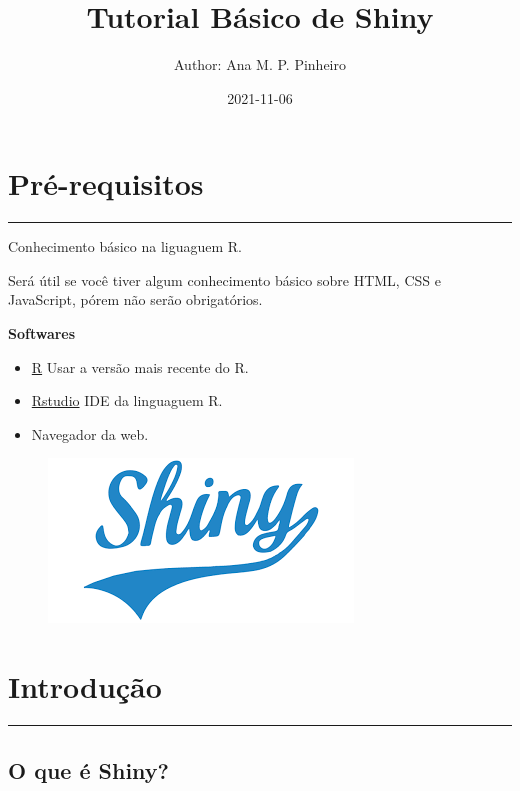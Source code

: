 \documentclass[
]{book}
\title{Tutorial Básico de Shiny}
\author{Author: Ana M. P. Pinheiro}
\date{2021-11-06}
\providecommand{\tightlist}{%
  \setlength{\itemsep}{0pt}\setlength{\parskip}{0pt}}
\begin{document}
\maketitle

{
\setcounter{tocdepth}{1}
\tableofcontents
}
\hypertarget{pruxe9-requisitos}{%
\chapter*{Pré-requisitos}\label{pruxe9-requisitos}}

\begin{center}\rule{0.5\linewidth}{0.5pt}\end{center}

Conhecimento básico na liguaguem R.

Será útil se você tiver algum conhecimento básico sobre HTML, CSS e JavaScript, pórem não serão obrigatórios.

\textbf{Softwares}

\begin{itemize}
\tightlist
\item
  \href{https://www.r-project.org/}{R} Usar a versão mais recente do R.
\item
  \href{https://www.rstudio.com/}{Rstudio} IDE da linguaguem R.
\item
  Navegador da web.
\end{itemize}

\begin{figure}

{\centering \includegraphics[width=0.3\linewidth]{www/img/shiny} 

}

\end{figure}

\hypertarget{introduuxe7uxe3o}{%
\chapter{Introdução}\label{introduuxe7uxe3o}}

\begin{center}\rule{0.5\linewidth}{0.5pt}\end{center}

\hypertarget{o-que-uxe9-shiny}{%
\section{\texorpdfstring{\textbf{O que é Shiny?}}{O que é Shiny?}}\label{o-que-uxe9-shiny}}
\end{document}

